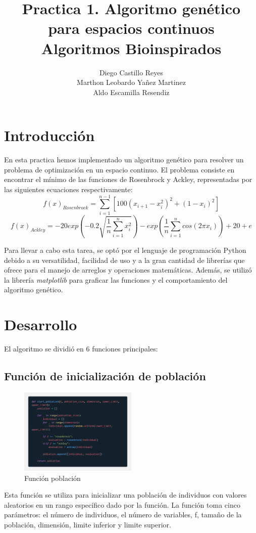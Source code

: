 \documentclass{report}
\title{\Huge{\textbf{Practica 1. Algoritmo genético para espacios continuos}}\\
\Large{\textbf{Algoritmos Bioinspirados}}}
\author{Diego Castillo Reyes\\Marthon Leobardo Yañez Martinez\\Aldo Escamilla Resendiz}
\begin{document}
    \maketitle
    \newpage
    \section*{Introducción}
    En esta practica hemos implementado un algoritmo genético para resolver un problema de optimización en un espacio continuo. 
    El problema consiste en encontrar el mínimo de las funciones de Rosenbrock y Ackley, representadas por las siguientes ecuaciones respectivamente:
    \begin{equation}
        f(x)_{Rosenbrock} = \sum_{i=1}^{n-1} [100(x_{i+1} - x_{i}^2)^2 + (1 - x_{i})^2]
    \end{equation}
    \begin{equation}
        f(x)_{Ackley} = -20exp(-0.2\sqrt{\frac{1}{n}\sum_{i=1}^{n}x_{i}^2}) - exp(\frac{1}{n}\sum_{i=1}^{n}cos(2\pi x_{i})) + 20 + e
    \end{equation}

    Para llevar a cabo esta tarea, se optó por el lenguaje de programación Python debido a su versatilidad, facilidad de uso y a la gran cantidad de librerías que ofrece 
    para el manejo de arreglos y operaciones matemáticas. Además, se utilizó la librería \textit{matplotlib} para graficar las funciones y el comportamiento 
    del algoritmo genético.

    \section*{Desarrollo}
    El algoritmo se dividió en 6 funciones principales:
    \subsection*{Función de inicialización de población}
    \begin{figure}[h]
        \centering
        \includegraphics[width=0.5\textwidth]{funcionPoblacion.png}
        \caption{Función población}
    \end{figure}
    Esta función se utiliza para inicializar una población de individuos 
    con valores aleatorios en un rango específico dado por la función. La función toma cinco parámetros: el número de individuos, el número de variables,
    f, tamaño de la población, dimensión, limite inferior y limite superior.
    
\end{document}
